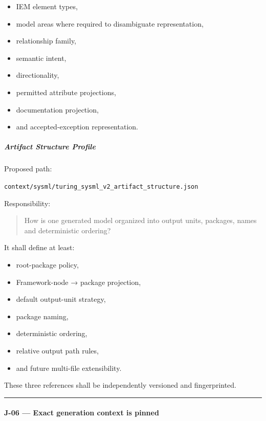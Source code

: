 \begin{itemize}
\tightlist
\item
  IEM element types,
\item
  model areas where required to disambiguate representation,
\item
  relationship family,
\item
  semantic intent,
\item
  directionality,
\item
  permitted attribute projections,
\item
  documentation projection,
\item
  and accepted-exception representation.
\end{itemize}

\hypertarget{artifact-structure-profile}{%
\subparagraph{Artifact Structure Profile}\label{artifact-structure-profile}}

Proposed path:

\texttt{context/sysml/turing\_sysml\_v2\_artifact\_structure.json}

Responsibility:

\begin{quote}
How is one generated model organized into output units, packages, names and deterministic ordering?
\end{quote}

It shall define at least:

\begin{itemize}
\tightlist
\item
  root-package policy,
\item
  Framework-node → package projection,
\item
  default output-unit strategy,
\item
  package naming,
\item
  deterministic ordering,
\item
  relative output path rules,
\item
  and future multi-file extensibility.
\end{itemize}

These three references shall be independently versioned and fingerprinted.

\begin{center}\rule{0.5\linewidth}{0.5pt}\end{center}

\hypertarget{j-06--exact-generation-context-is-pinned}{%
\paragraph{J-06 --- Exact generation context is pinned}\label{j-06--exact-generation-context-is-pinned}}

